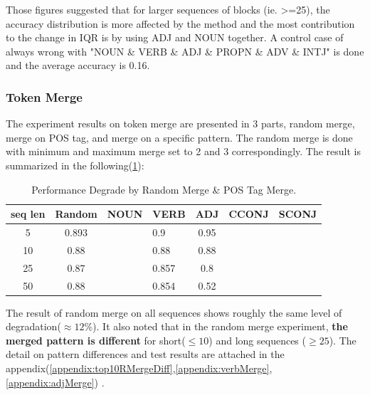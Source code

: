 \documentclass[12pt]{article}
\begin{document}
Those figures suggested that for larger sequences of blocks (ie. >=25), the accuracy distribution is more affected by the method and the most contribution to the change in IQR is by using ADJ and NOUN together.
A control case of always wrong with "NOUN \& VERB \& ADJ \& PROPN \& ADV \& INTJ" is done and the average accuracy is 0.16. 

\subsubsection{Token Merge}
The experiment results on token merge are presented in 3 parts, random merge, merge on POS tag, and merge on a specific pattern. The random merge is done with minimum and maximum merge set to 2 and 3 correspondingly. The result is summarized in the following(\ref{tab:mergeDegrade}):

\begin{table}[!h]
\fontsize{10pt}{10pt}\selectfont
\begin{tabular}{|c|c|c|l|c|l|l|}
\hline
seq len & Random & NOUN & VERB  & ADJ  & CCONJ & SCONJ \\ \hline
5       & 0.893  &      & 0.9   & 0.95 &       &       \\ \hline
10      & 0.88   &      & 0.88  & 0.88 &       &       \\ \hline
25      & 0.87   &      & 0.857 & 0.8  &       &       \\ \hline
50      & 0.88   &      & 0.854 & 0.52 &       &       \\ \hline
\end{tabular}
\caption{Performance Degrade by Random Merge \& POS Tag Merge.}
\label{tab:mergeDegrade}
\end{table}
The result of random merge on all sequences shows roughly the same level of degradation($\approx12\%$). It also noted that in the random merge experiment, \textbf{the merged pattern is different} for short($\leq10$) and long sequences ($\geq25$). The detail on pattern differences and test results are attached in the appendix(\ref{appendix:top10RMergeDiff},\ref{appendix:verbMerge},\ref{appendix:adjMerge}) .\\
\end{document}
